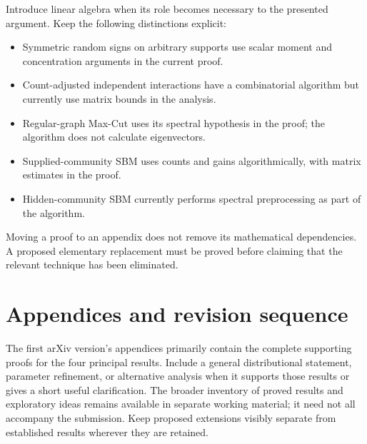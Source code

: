 \documentclass[11pt,a4paper]{article}
\begin{document}
Introduce linear algebra when its role becomes necessary to the
presented argument. Keep the following distinctions explicit:
\begin{itemize}
\item Symmetric random signs on arbitrary supports use scalar moment
and concentration arguments in the current proof.
\item Count-adjusted independent interactions have a combinatorial
algorithm but currently use matrix bounds in the analysis.
\item Regular-graph Max-Cut uses its spectral hypothesis in the proof;
the algorithm does not calculate eigenvectors.
\item Supplied-community SBM uses counts and gains algorithmically,
with matrix estimates in the proof.
\item Hidden-community SBM currently performs spectral preprocessing
as part of the algorithm.
\end{itemize}
Moving a proof to an appendix does not remove its mathematical
dependencies. A proposed elementary replacement must be proved before
claiming that the relevant technique has been eliminated.

\section{Appendices and revision sequence}

The first arXiv version's appendices primarily contain the complete
supporting proofs for the four principal results. Include a general
distributional statement, parameter refinement, or alternative analysis
when it supports those results or gives a short useful clarification.
The broader inventory of proved results and exploratory ideas remains
available in separate working material; it need not all accompany the
submission. Keep proposed extensions visibly separate from established
results wherever they are retained.
\end{document}

